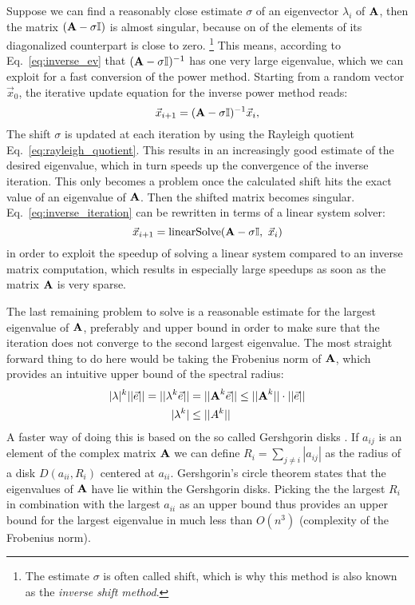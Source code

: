 Suppose we can find a reasonably close estimate $\sigma$ of an eigenvector $\lambda_i$
of $\boldsymbol{\textbf{A}}$, then the matrix $(\boldsymbol{\textbf{A}} - \sigma \mathbb{I})$ is almost singular,
because on of the elements of its diagonalized counterpart is close to zero.
\footnote{The estimate $\sigma$ is often called shift, which is why this method is also known
as the \textit{inverse shift method}.}
This means, according to Eq.~\ref{eq:inverse_ev} that
$(\boldsymbol{\textbf{A}} - \sigma \mathbb{I})^{-1}$ has one very large eigenvalue,
which we can exploit for a fast conversion of the power method.
Starting from a random vector $\vec{x}_0$, the iterative update equation for the
inverse power method reads:
\begin{equation}
  \label{eq:inverse_iteration}
  \vec{x}_{i+1} = (\boldsymbol{\textbf{A}} - \sigma \mathbb{I})^{-1} \vec{x}_i,
\end{equation}
The shift $\sigma$ is updated at each iteration by using the Rayleigh
quotient Eq.~\ref{eq:rayleigh_quotient}.
This results in an increasingly good estimate of the desired eigenvalue, which
in turn speeds up the convergence of the inverse iteration.
This only becomes a problem once the calculated shift hits the exact value of
an eigenvalue of $\boldsymbol{\textbf{A}}$. Then the shifted matrix becomes singular.
\\
Eq.~\ref{eq:inverse_iteration} can be rewritten in terms of a linear system solver:
\begin{equation}
  \vec{x}_{i+1} = \text{linearSolve}(\boldsymbol{\textbf{A}} - \sigma \mathbb{I}, \text{ }\vec{x}_i)
\end{equation}
in order to exploit the speedup of solving a linear system compared to an inverse
matrix computation, which results in especially large speedups as soon as the
matrix $\boldsymbol{\textbf{A}}$ is very sparse.

The last remaining problem to solve is a reasonable estimate for the largest eigenvalue
of $\boldsymbol{\textbf{A}}$, preferably and upper bound in order to make sure that the iteration
does not converge to the second largest eigenvalue.
The most straight forward thing to do here would be taking the Frobenius norm of $\boldsymbol{\textbf{A}}$,
which provides an intuitive upper bound of the spectral radius:
\begin{align}
  |\lambda|^k ||\vec{e}|| = ||\lambda^k \vec{e}||
  &= ||\boldsymbol{\textbf{A}}^k \vec{e}|| \leq ||\boldsymbol{\textbf{A}}^k|| \cdot ||\vec{e}|| \\
  |\lambda^k| &\leq ||A^k||
\end{align}
A faster way of doing this is based on the so called Gershgorin disks \cite{Gershgorin}.
If $a_{ij}$ is an element of the complex matrix $\boldsymbol{\textbf{A}}$ we can define
$R_i=\sum_{j\neq i}|a_{ij}|$ as the radius of a disk $D(a_{ii}, R_i)$ centered at
$a_{ii}$.
Gershgorin's circle theorem states that the eigenvalues of $\boldsymbol{\textbf{A}}$ have lie
within the Gershgorin disks.
Picking the the largest $R_i$ in combination with the largest $a_{ii}$ as an upper
bound thus provides an upper bound for the largest eigenvalue in much less than
$O(n^3)$ (complexity of the Frobenius norm).

